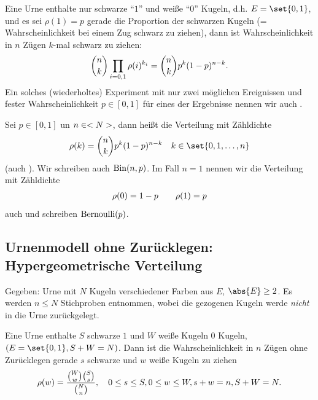 \begin{example}
	Eine Urne enthalte nur schwarze ``$1$'' und weiße ``$0$'' Kugeln, d.h. $E=\set{0,1}$, und es sei $\rho(1) = p$ gerade die Proportion der schwarzen Kugeln (= Wahrscheinlichkeit bei einem Zug schwarz zu ziehen), dann ist Wahrscheinlichkeit in $n$ Zügen $k$-mal schwarz zu ziehen:
	\begin{align}
		\binom{n}{k}\prod_{i=0,1} \rho(i)^{k_i} = \binom{n}{k} p^k (1-p)^{n-k}.\notag
	\end{align}
	Ein solches (wiederholtes) Experiment mit nur zwei möglichen Ereignissen und fester Wahrscheinlichkeit $p \in [0,1]$ für eines der Ergebnisse nennen wir auch .
\end{example}

\begin{definition}
	Sei $p \in [0,1]$ un $n \in <N>$, dann heißt die Verteilung mit Zähldichte
	\begin{align}
		\rho(k) = \binom{n}{k}p^k (1-p)^{n-k}\quad k \in \set{0,1,\dots,n}\notag
	\end{align}
	 (auch ). Wir schreiben auch $\operatorname{Bin}(n,p)$. Im Fall $n = 1$ nennen wir die Verteilung mit Zähldichte
	\begin{align}
		\rho(0) = 1-p \qquad \rho(1) = p\notag
	\end{align}
	auch  und schreiben $\operatorname{Bernoulli}(p)$.
\end{definition}

\subsection{Urnenmodell ohne Zurücklegen: Hypergeometrische Verteilung}
Gegeben: Urne mit $N$ Kugeln verschiedener Farben aus $E$, $\abs{E} \ge 2$. Es werden $n \le N$ Stichproben entnommen, wobei die gezogenen Kugeln werde \emph{nicht} in die Urne zurückgelegt.
\begin{example}
	Eine Urne enthalte $S$ schwarze $1$ und $W$ weiße Kugeln $0$ Kugeln, $(E = \set{0,1}, S + W =N)$. Dann ist die Wahrscheinlichkeit in $n$ Zügen ohne Zurücklegen gerade $s$ schwarze und $w$ weiße Kugeln zu ziehen
	\begin{align}
		\rho(w) = \frac{\binom{W}{w}\binom{S}{s}}{\binom{N}{n}}, \quad 0 \le s \le S, 0 \le w \le W, s+w = n, S+W = N.\notag
	\end{align}
\end{example}

